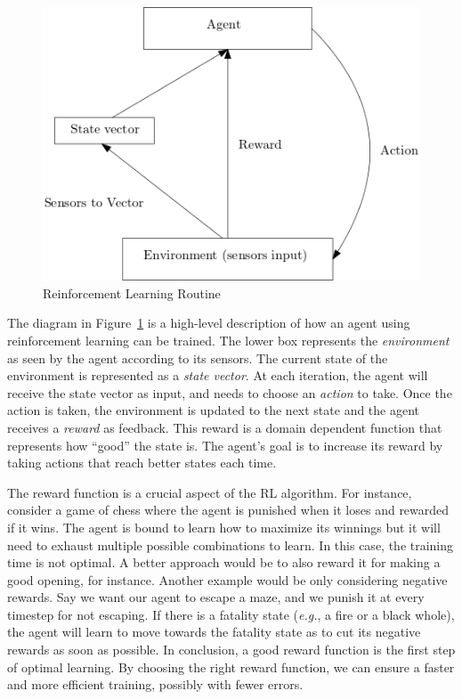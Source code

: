 \documentclass[a4paper,11pt]{article}
\theoremstyle{definition}
\begin{document}
\begin{figure}[H]
  \centering
  \includegraphics[scale=0.6]{rlroutine.png}
  \caption{Reinforcement Learning Routine}
  \label{fig:rl}
\end{figure}


The diagram in Figure~\ref{fig:rl} is a high-level description of how
an agent using reinforcement learning can be trained.  
%
The lower box represents the \emph{environment} as seen by the agent
according to its sensors.
%
The current state of the environment is represented as a \emph{state
vector}.
%
At each iteration, the agent will receive the state vector as input,
and needs to choose an \emph{action} to take.
%
Once the action is taken, the environment is updated to the next state
and the agent receives a \emph{reward} as feedback.
%
This reward is a domain dependent function that represents how
``good'' the state is.
%
The agent's goal is to increase its reward by taking actions that
reach better states each time.

\medskip 

The reward function is a crucial aspect of the RL algorithm. For instance, consider a game of chess 
where the agent is punished when it loses and rewarded if it wins. The agent is bound to learn how to 
maximize its winnings but it will need to exhaust multiple possible combinations to learn. In this case, 
the training time is not optimal. A better approach would be to also reward it for making a good opening, for instance. 
Another example would be only considering negative rewards. Say we want our agent to escape a maze, and we punish it at every timestep for not escaping. 
If there is a fatality state (\emph{e.g.}, a fire or a black whole), the agent will learn to move towards the fatality state as to cut its negative rewards as soon as possible. 
In conclusion, a good reward function is the first step of optimal learning. By choosing the right reward function, 
we can ensure a faster and more efficient training, possibly with fewer errors. 
\end{document}
